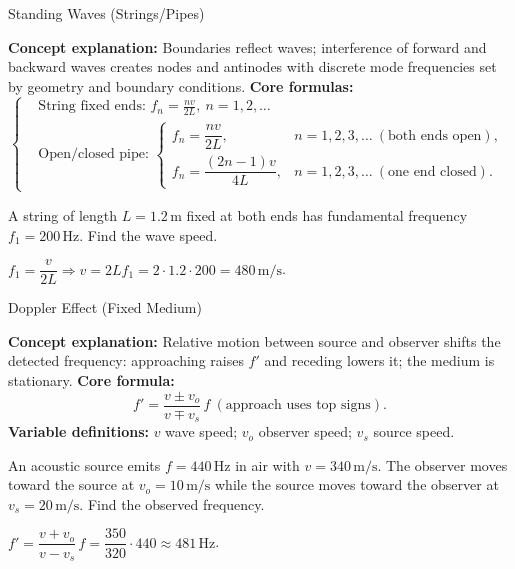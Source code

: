 \begin{KnowledgePoint}{Standing Waves (Strings/Pipes) \Core}
  \KPFormulas
  \begin{formulabox}
  \textbf{Concept explanation:} Boundaries reflect waves; interference of forward and backward waves creates nodes and antinodes with discrete mode frequencies set by geometry and boundary conditions.
  \textbf{Core formulas:}
  \[
  \left\{\begin{aligned}
    &\text{String fixed ends: } f_n=\frac{nv}{2L},\ n=1,2,\dots\\
    &\text{Open/closed pipe: }\begin{cases}
      f_n=\dfrac{nv}{2L}, & n=1,2,3,\dots\ (\text{both ends open}),\\
      f_n=\dfrac{(2n-1)v}{4L}, & n=1,2,3,\dots\ (\text{one end closed}).
    \end{cases}
  \end{aligned}\right.
  \]
  \end{formulabox}

  \KPProblems
  \begin{cheatproblem}
  A string of length $L=1.2\,\text{m}$ fixed at both ends has fundamental frequency $f_1=200\,\text{Hz}$. Find the wave speed.
  \begin{solutionbox}
  $f_1=\dfrac{v}{2L}\Rightarrow v=2Lf_1=2\cdot1.2\cdot200=480\,\text{m/s}$.
  \end{solutionbox}
  \end{cheatproblem}
\end{KnowledgePoint}

\begin{KnowledgePoint}{Doppler Effect (Fixed Medium) \Core}
  \KPFormulas
  \begin{formulabox}
  \textbf{Concept explanation:} Relative motion between source and observer shifts the detected frequency: approaching raises $f'$ and receding lowers it; the medium is stationary.
  \textbf{Core formula:}
  \[
    f'=\frac{v\pm v_o}{v\mp v_s}\,f\ (\text{approach uses top signs}).
  \]
  \textbf{Variable definitions:} $v$ wave speed; $v_o$ observer speed; $v_s$ source speed.
  \end{formulabox}

  \KPProblems
  \begin{cheatproblem}
  An acoustic source emits $f=440\,\text{Hz}$ in air with $v=340\,\text{m/s}$. The observer moves toward the source at $v_o=10\,\text{m/s}$ while the source moves toward the observer at $v_s=20\,\text{m/s}$. Find the observed frequency.
  \begin{solutionbox}
  $f'=\dfrac{v+v_o}{v-v_s}\,f=\dfrac{350}{320}\cdot 440\approx 481\,\text{Hz}$.
  \end{solutionbox}
  \end{cheatproblem}
\end{KnowledgePoint}

